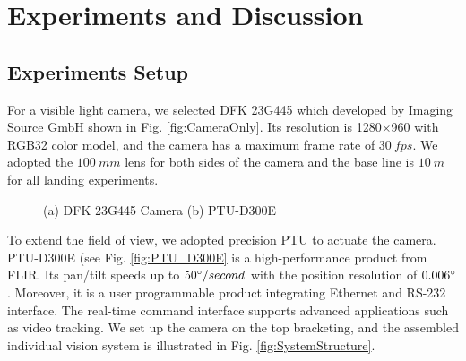 \section{Experiments and Discussion}
\subsection{Experiments Setup}
For a visible light camera, we selected DFK 23G445 which developed by Imaging Source GmbH shown in Fig. \ref{fig:CameraOnly}. Its resolution is 1280$\times$960 with RGB32 color model, and the camera has a maximum frame rate of $30\ fps$. We adopted the $100\ mm$ lens for both sides of the camera and the base line is $10\ m$ for all landing experiments.
 


\begin{figure}[!tb]
	\centering
	\caption{(a) DFK 23G445 Camera (b) PTU-D300E}
\end{figure}
To extend the field of view, we adopted precision PTU to actuate the camera. PTU-D300E (see Fig. \ref{fig:PTU_D300E} is a high-performance product from FLIR. Its pan/tilt speeds up to $50\degree/second$ with the position resolution of $0.006\degree$. Moreover, it is a user programmable product integrating Ethernet and RS-232 interface. The real-time command interface supports advanced applications such as video tracking. We set up the camera on the top bracketing, and the assembled individual vision system is illustrated in Fig. \ref{fig:SystemStructure}. 

